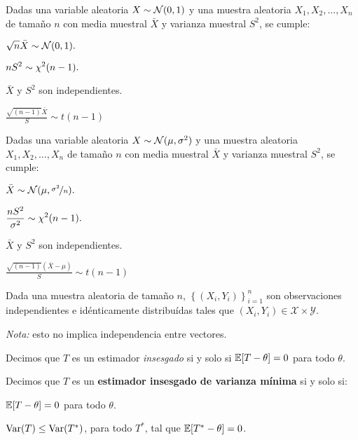 \documentclass[8pt,a4paper]{extarticle}
\begin{document}
\begin{multicols}{3}
	\begin{boxprop}
		Dadas una variable aleatoria $X \sim \mathcal{N}(0,1)$ y una muestra aleatoria $X_1, X_2, \dots, X_n$ de tamaño $n$ con media muestral $\bar{X}$ y varianza muestral $S^2$, se cumple:
		\begin{eqlist}
			\item $\displaystyle \sqrt{n}\bar{X} \sim \mathcal{N}(0,1).$
			\item $\displaystyle nS^2 \sim \chi^2(n -1).$
			\item $\bar{X}$ y $S^2$ son independientes.
			\item $\displaystyle \frac{\sqrt{(n -1)} \bar{X}}{S} \sim t(n - 1)$
		\end{eqlist}
	\end{boxprop}

	\begin{boxprop}
		Dadas una variable aleatoria $X \sim \mathcal{N}(\mu,\sigma^2)$ y una muestra aleatoria $X_1, X_2, \dots, X_n$ de tamaño $n$ con media muestral $\bar{X}$ y varianza muestral $S^2$, se cumple:
		\begin{eqlist}
			\item $\displaystyle \bar{X} \sim \mathcal{N}(\mu,\nicefrac{\sigma^2}{n}).$
			\item $\displaystyle \frac{nS^2}{\sigma^2} \sim \chi^2(n -1).$
			\item $\bar{X}$ y $S^2$ son independientes.
			\item $\displaystyle \frac{\sqrt{(n -1)} (\bar{X} - \mu)}{S} \sim t(n - 1)$
		\end{eqlist}
	\end{boxprop}

	\begin{boxtheo}
		Dada una muestra aleatoria de tamaño $n$, $\displaystyle \left\{ \left( X_i, Y_i \right) \right\}_{i=1}^n$ son observaciones independientes e idénticamente distribuídas tales que $(X_i,Y_i) \in \mathcal{X} \times \mathcal{Y}$. \par
		\emph{Nota:} esto no implica independencia entre vectores.
	\end{boxtheo}

	\begin{boxrmk}
		Decimos que $T$ es un estimador \emph{insesgado} si y solo si $\mathbb{E}[T - \theta] = 0$ para todo $\theta$.
	\end{boxrmk}

	\begin{boxdef}
		Decimos que $T$ es un \textbf{estimador insesgado de varianza mínima} si y solo si:
		\begin{eqlist}
			\item $\mathbb{E}[T - \theta] = 0$ para todo $\theta$.
			\item $\text{\normalfont Var}(T) \leq \text{\normalfont Var}(T^*)$, para todo $T^*$, tal que $\mathbb{E}[T^* - \theta] = 0$.
		\end{eqlist}
	\end{boxdef}


\end{multicols}
\end{document}
